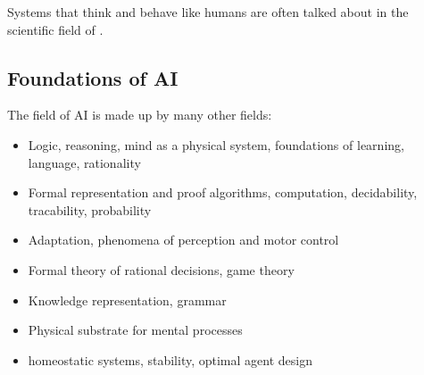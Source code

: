 \documentclass[
../../EiKI_Summary.tex,
]
{subfiles}
\begin{document}
Systems that think and behave like humans are often talked about in the scientific field of .

\subsection{Foundations of AI}

The field of AI is made up by many other fields:
\begin{itemize}
    \item {} Logic, reasoning, mind as a physical system, foundations of learning, language, rationality
    \item {} Formal representation and proof algorithms, computation, decidability, tracability, probability
    \item {} Adaptation, phenomena of perception and motor control
    \item {} Formal theory of rational decisions, game theory
    \item {} Knowledge representation, grammar
    \item {} Physical substrate for mental processes
    \item {} homeostatic systems, stability, optimal agent design
\end{itemize}
\end{document}

